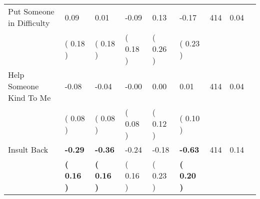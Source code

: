 \begin{tabular}{L{6.2cm} C{1.8cm} C{1.8cm} C{1.8cm} C{1.8cm} C{1.8cm} C{1.8cm} C{0.3cm} C{0.3cm}}
Put Someone in Difficulty &      0.09 &      0.01 &     -0.09 &      0.13 &     -0.17  & 414 &       0.04 \\ 
 & (     0.18 ) & (     0.18 ) & (     0.18 ) & (     0.26 ) & (     0.23 )  & \\
Help Someone Kind To Me &     -0.08 &     -0.04 &     -0.00 &      0.00 &      0.01  & 414 &       0.04 \\ 
 & (     0.08 ) & (     0.08 ) & (     0.08 ) & (     0.12 ) & (     0.10 )  & \\
Insult Back & \textbf{    -0.29} & \textbf{    -0.36} &     -0.24 &     -0.18 & \textbf{    -0.63}  & 414 &       0.14 \\ 
 & \textbf{(     0.16 )} & \textbf{(     0.16 )} & (     0.16 ) & (     0.23 ) & \textbf{(     0.20 )}  & \\
\bottomrule
\end{tabular}
